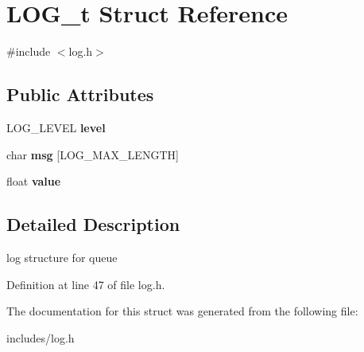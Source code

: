 \hypertarget{structLOG__t}{}\section{L\+O\+G\+\_\+t Struct Reference}
\label{structLOG__t}


{\ttfamily \#include $<$log.\+h$>$}

\subsection*{Public Attributes}
\begin{DoxyCompactItemize}
\item 
\mbox{\label{structLOG__t_af2a06cb9e51a3312f77fe2ec5855199a}} 
L\+O\+G\+\_\+\+L\+E\+V\+EL {\bfseries level}
\item 
\mbox{\label{structLOG__t_a7fe4b8703a4db5062a01d29d4893a3f9}} 
char {\bfseries msg} \mbox{[}L\+O\+G\+\_\+\+M\+A\+X\+\_\+\+L\+E\+N\+G\+TH\mbox{]}
\item 
\mbox{\label{structLOG__t_a46e8ea6166b4a584aca33d06c22a187c}} 
float {\bfseries value}
\end{DoxyCompactItemize}


\subsection{Detailed Description}
log structure for queue 

Definition at line 47 of file log.\+h.



The documentation for this struct was generated from the following file\+:\begin{DoxyCompactItemize}
\item 
includes/log.\+h\end{DoxyCompactItemize}
